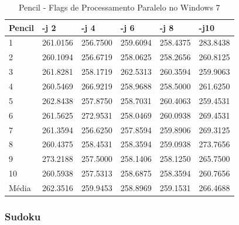 \begin{table}[!ht]
\centering
\tiny
\caption{Pencil - Flags de Processamento Paralelo no Windows 7}
\label{tab:flag_processamento_paralelo:windows:pencil}
\begin{tabular}{llllll}
\textbf{Pencil} & \textbf{-j 2} & \textbf{-j 4} & \textbf{-j 6} & \textbf{-j 8} & \textbf{-j10}  \\ \toprule
1               & 261.0156  &   256.7500 &    259.6094   &  258.4375 &    283.8438           \\ 
2               & 260.1094  &   256.6719 &    258.0625   &  258.2656 &    260.8125           \\ 
3               & 261.8281  &   258.1719 &    262.5313   &  260.3594 &    259.9063           \\ 
4               & 260.5469  &   266.9219 &    258.9688   &  258.5000 &    261.6250           \\ 
5               & 262.8438  &   257.8750 &    258.7031   &  260.4063 &    259.4531           \\ 
6               & 261.5625  &   272.9531 &    258.0469   &  260.0938 &    269.4531           \\ 
7               & 261.3594  &   256.6250 &    257.8594   &  259.8906 &    269.3125           \\ 
8               & 260.4375  &   258.4531 &    258.3594   &  259.0938 &    273.7656           \\ 
9               & 273.2188  &   257.5000 &    258.1406   &  258.1250 &    265.7500           \\ 
10              & 260.5938  &   257.5313 &    258.6875   &  258.3594 &    260.7656           \\ \bottomrule
Média           & 262.3516  &   259.9453 &    258.8969   &  259.1531 &    266.4688           \\ 
\end{tabular}
\end{table}

\clearpage
\subsubsection*{Sudoku}

